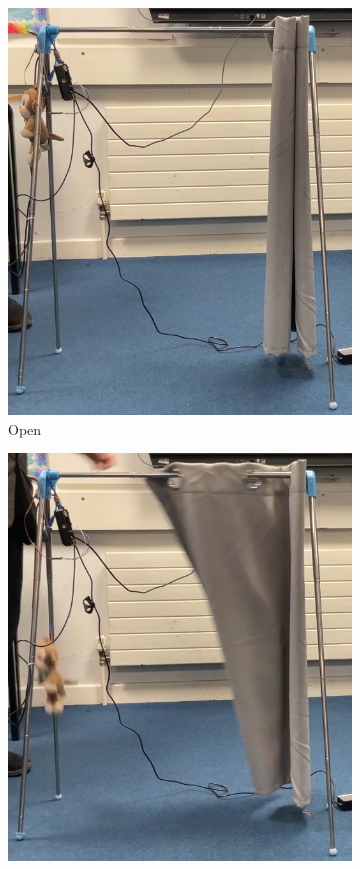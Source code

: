 \documentclass[a4paper,12pt]{article}
\begin{document}
\begin{figure}
    \centering
    \begin{subfigure}[][][]{0.24\textwidth}
        \includegraphics[width=\linewidth]{figures/model_curtainClosing0.png}
        \caption{Open}
    \end{subfigure}
        \begin{subfigure}[][][]{0.24\textwidth}
        \includegraphics[width=\linewidth]{figures/model_curtainClosing1.png}

\end{subfigure}
\end{figure}
\end{document}
